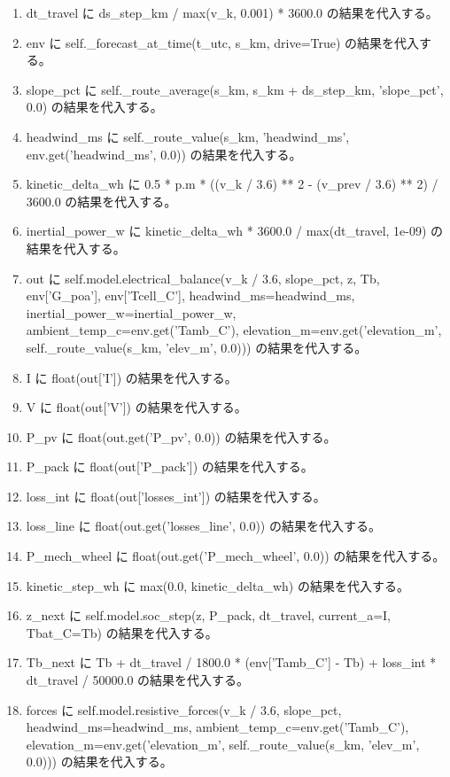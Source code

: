 \documentclass[a4paper,11pt]{article}
\begin{document}
\begin{enumerate}[leftmargin=1.8em]
\item   dt\_travel に ds\_step\_km / max(v\_k, 0.001) * 3600.0 の結果を代入する。
\item   env に self.\_forecast\_at\_time(t\_utc, s\_km, drive=True) の結果を代入する。
\item   slope\_pct に self.\_route\_average(s\_km, s\_km + ds\_step\_km, 'slope\_pct', 0.0) の結果を代入する。
\item   headwind\_ms に self.\_route\_value(s\_km, 'headwind\_ms', env.get('headwind\_ms', 0.0)) の結果を代入する。
\item   kinetic\_delta\_wh に 0.5 * p.m * ((v\_k / 3.6) ** 2 - (v\_prev / 3.6) ** 2) / 3600.0 の結果を代入する。
\item   inertial\_power\_w に kinetic\_delta\_wh * 3600.0 / max(dt\_travel, 1e-09) の結果を代入する。
\item   out に self.model.electrical\_balance(v\_k / 3.6, slope\_pct, z, Tb, env['G\_poa'], env['Tcell\_C'], headwind\_ms=headwind\_ms, inertial\_power\_w=inertial\_power\_w, ambient\_temp\_c=env.get('Tamb\_C'), elevation\_m=env.get('elevation\_m', self.\_route\_value(s\_km, 'elev\_m', 0.0))) の結果を代入する。
\item   I に float(out['I']) の結果を代入する。
\item   V に float(out['V']) の結果を代入する。
\item   P\_pv に float(out.get('P\_pv', 0.0)) の結果を代入する。
\item   P\_pack に float(out['P\_pack']) の結果を代入する。
\item   loss\_int に float(out['losses\_int']) の結果を代入する。
\item   loss\_line に float(out.get('losses\_line', 0.0)) の結果を代入する。
\item   P\_mech\_wheel に float(out.get('P\_mech\_wheel', 0.0)) の結果を代入する。
\item   kinetic\_step\_wh に max(0.0, kinetic\_delta\_wh) の結果を代入する。
\item   z\_next に self.model.soc\_step(z, P\_pack, dt\_travel, current\_a=I, Tbat\_C=Tb) の結果を代入する。
\item   Tb\_next に Tb + dt\_travel / 1800.0 * (env['Tamb\_C'] - Tb) + loss\_int * dt\_travel / 50000.0 の結果を代入する。
\item   forces に self.model.resistive\_forces(v\_k / 3.6, slope\_pct, headwind\_ms=headwind\_ms, ambient\_temp\_c=env.get('Tamb\_C'), elevation\_m=env.get('elevation\_m', self.\_route\_value(s\_km, 'elev\_m', 0.0))) の結果を代入する。

\end{enumerate}
\end{document}
